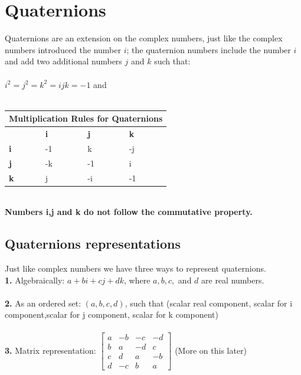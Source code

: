 \documentclass{article}
\begin{document}
\section{Quaternions}
\label{sec:Q}
Quaternions are an extension on the complex numbers, just like the complex numbers introduced the number $i$; the quaternion numbers include the number $i$ and add two additional numbers $j$ and $k$ such that:\\\\
$i^2=j^2=k^2=ijk=-1$ and \\\\
\begin{tabular}{ |p{3cm}|p{3cm}|p{3cm}| p{3cm} |}
\hline
\multicolumn{4}{|c|}{Multiplication Rules for Quaternions} \\
\hline
 & \textbf{i} & \textbf{j} & \textbf{k} \\
\hline
\textbf{i} & -1 & k & -j\\
\textbf{j} & -k & -1 & i\\
\textbf{k} & j & -i & -1\\
\hline
\end{tabular}\\
\textbf{Numbers i,j and k do not follow the commutative property.}
\subsection{Quaternions representations}
Just like complex numbers we have three ways to represent quaternions. \\
\textbf{1. } Algebraically: $a + bi + cj + dk$,  where $a,b,c,$ and $d$ are real numbers.\\\\
\textbf{2. } As an ordered set: $(a,b,c,d)$, such that (scalar real component, scalar for i component,scalar for j component, scalar for k component)\\\\
\textbf{3. }Matrix representation: $\begin{bmatrix}
a & -b & -c & -d\\
b & a & -d & c\\
c & d & a & -b \\
d & -c & b & a
\end{bmatrix}$ (More on this later)
\end{document}
